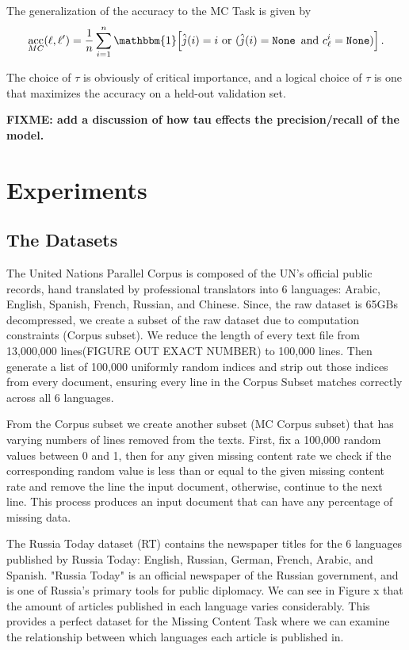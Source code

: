 \documentclass[11pt]{article}
\newcommand{\indicator}[1]{\mathbbm{1}\!\left[{#1}\right]}
\newcommand{\fixme}[1]{\textbf{FIXME: {#1}}}
\DeclareMathOperator{\acc}{acc}
\DeclareMathOperator{\none}{\texttt{None}}
\begin{document}
The generalization of the accuracy to the MC Task is given by
\begin{equation}
    \acc_{MC}(\ell,\ell') = \frac 1 n \sum_{i=1}^n \indicator{\hat j(i) = i ~\text{or}~ (\hat j(i) = \none ~\text{and}~ c_\ell^i = \none) }
    .
\end{equation}

The choice of $\tau$ is obviously of critical importance,
and a logical choice of $\tau$ is one that maximizes the accuracy on a held-out validation set.

\fixme{add a discussion of how tau effects the precision/recall of the model.}

\section{Experiments}
\label{sec:experiments}
\subsection{The Datasets}
The United Nations Parallel Corpus \cite{NEED CITATION} is composed of the UN's official public records, hand translated by professional translators into 6 languages: Arabic, English, Spanish, French, Russian, and Chinese. Since, the raw dataset is 65GBs decompressed, we create a subset of the raw dataset due to computation constraints (Corpus subset). We reduce the length of every text file from 13,000,000 lines(FIGURE OUT EXACT NUMBER) to 100,000 lines. Then generate a list of 100,000 uniformly random indices and strip out those indices from every document, ensuring every line in the Corpus Subset matches correctly across all 6 languages. 

From the Corpus subset we create another subset (MC Corpus subset) that has varying numbers of lines removed from the texts. First, fix a 100,000 random values between 0 and 1, then for any given missing content rate we check if the corresponding random value is less than or equal to the given missing content rate and remove the line the input document, otherwise, continue to the next line. This process produces an input document that can have any percentage of missing data. 

The Russia Today dataset (RT) contains the newspaper titles for the 6 languages published by Russia Today: English, Russian, German, French, Arabic, and Spanish. "Russia Today" is an official newspaper of the Russian government, and is one of Russia's primary tools for public diplomacy. We can see in Figure x that the amount of articles published in each language varies considerably. This provides a perfect dataset for the Missing Content Task where we can examine the relationship between which languages each article is published in. 
\end{document}
